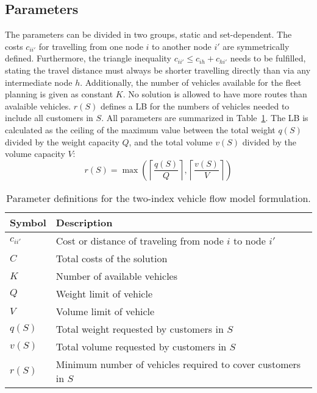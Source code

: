 \subsection*{Parameters}
The parameters can be divided in two groups, static and set-dependent.
The costs $c_{ii'}$ for travelling from one node $i$ to another node $i'$
are symmetrically defined. Furthermore, the triangle inequality
$c_{ii'} \leq c_{ih} + c_{hi'}$ needs to be fulfilled, stating the travel distance must always be shorter travelling
directly than via any intermediate node $h$. Additionally, the number of vehicles
available for the fleet planning is given as constant $K$. No solution is allowed to have
more routes than avalaible vehicles. $r(S)$ defines a \gls{LB} for the numbers of vehicles needed
to include all customers in $S$. All parameters are summarized in Table~\ref{tab:parameter_definitions}.
The \gls{LB} is calculated as the ceiling of the maximum
value between the total weight $q(S)$ divided by the weight capacity $Q$, and the
total volume $v(S)$ divided by the volume capacity $V$:
\[r(S) = \max\left( \left\lceil \frac{q(S)}{Q} \right\rceil, \left\lceil \frac{v(S)}{V} \right\rceil \right)\]
\begin{table}[ht]
    \centering
    \begin{tabular}{ll}
        \toprule
        Symbol    & Description                                                   \\
        \midrule
        $c_{ii'}$ & Cost or distance of traveling from node $i$ to node $i'$      \\
        $C$       & Total costs of the solution                                   \\
        $K$       & Number of available vehicles                                  \\
        $Q$       & Weight limit of vehicle                                       \\
        $V$       & Volume limit of vehicle                                       \\
        $q(S)$    & Total weight requested by customers in $S$                    \\
        $v(S)$    & Total volume requested by customers in $S$                    \\
        $r(S)$    & Minimum number of vehicles required to cover customers in $S$ \\
        \bottomrule
    \end{tabular}
    \caption{Parameter definitions for the two-index vehicle flow model formulation.}
    \label{tab:parameter_definitions}
\end{table}

